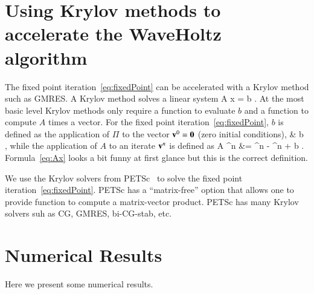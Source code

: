 \documentclass[preprint,11pt]{elsarticle}
\begin{document}
\section{Using Krylov methods to accelerate the WaveHoltz algorithm} \label{sec:KrylovAcceleration} 

The fixed point iteration~\eqref{eq:fixedPoint} can be accelerated with a Krylov
method such as GMRES.
A Krylov method solves a linear system
\ba
    A x = b .
\ea
At the most basic level Krylov methods only require a function to evaluate $b$ and a function
to compute $A$ times a vector.
For the fixed point iteration~\eqref{eq:fixedPoint}, $b$ is defined as the application of $\Pi$ to
the vector $\mathbf{ v}^0=\mathbf{0}$ (zero initial conditions),
\ba
&      b \eqdef \Pi\, \zerov,
\ea
while the application of $A$ to an iterate $\mathbf{ v}^n$ is defined as 
\ba
  A \vv^n &=  \vv^n - \Pi\vv^n + b .   \label{eq:Ax}
\ea
Formula~\eqref{eq:Ax} looks a bit funny at first glance but this is the correct definition.

We use the Krylov solvers from PETSc~\cite{petsc} to solve the fixed point iteration~\eqref{eq:fixedPoint}.
PETSc has a ``matrix-free'' option that allows one to provide function to compute
a matrix-vector product. PETSc has many Krylov solvers suh as CG, GMRES, bi-CG-stab, etc.


\clearpage


\clearpage


\clearpage
\section{Numerical Results} \label{sec:numericalResults}

Here we present some numerical results.





\clearpage



\clearpage





\end{document}

